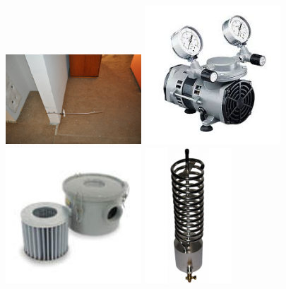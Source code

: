 \documentclass[12pt,oneside]{book}
\begin{document}
\begin{figure}[H]
	\centering
	\begin{minipage}[b]{0.5\linewidth}
		\centering
		\includegraphics[width = 2in]{0_Images/Instrumentation/Gas_Analyzer/SamplePoint.jpg}
	\end{minipage}

	\begin{minipage}[b]{0.5\linewidth}
		\centering
		\includegraphics[width = 2in]{0_Images/Instrumentation/Gas_Analyzer/VaccumPump.jpg}
	\end{minipage}
	
	\begin{minipage}[b]{0.5\linewidth}
		\centering
		\includegraphics[width = 2in]{0_Images/Instrumentation/Gas_Analyzer/CourseFilter.jpg}
	\end{minipage}
	
	\begin{minipage}[b]{0.5\linewidth}
		\centering
		\includegraphics[height = 2in]{0_Images/Instrumentation/Gas_Analyzer/CoilCondenser.png}
	\end{minipage}
	

\end{figure}
\end{document}
